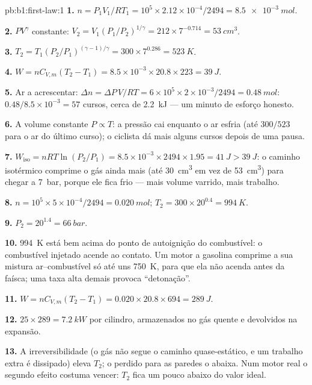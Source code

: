 \begin{solution}{pb:b1:first-law:1}
\textbf{1.} $n = P_1V_1/RT_1 = 10^5 \times 2.12\times10^{-4}/2494 = \qty{8.5e-3}{mol}$.

\textbf{2.} $PV^\gamma$ constante: $V_2 = V_1(P_1/P_2)^{1/\gamma} = 212 \times
7^{-0.714} = \qty{53}{cm^3}$.

\textbf{3.} $T_2 = T_1(P_2/P_1)^{(\gamma - 1)/\gamma} = 300 \times 7^{0.286} =
\qty{523}{K}$.

\textbf{4.} $W = nC_{V,m}(T_2 - T_1) = 8.5\times10^{-3} \times 20.8 \times 223 =
\qty{39}{J}$.

\textbf{5.} Ar a acrescentar: $\Delta n = \Delta P\,V/RT = 6\times10^5 \times 2\times10^{-3}/
2494 = \qty{0.48}{mol}$: $0.48/8.5\times10^{-3} = 57$ cursos, cerca de
\qty{2.2}{kJ} --- um minuto de esforço honesto.

\textbf{6.} A volume constante $P \propto T$: a pressão cai enquanto o ar
esfria (até $300/523$ para o ar do último curso); o ciclista dá mais alguns
cursos depois de uma pausa.

\textbf{7.} $W_{\text{iso}} = nRT\ln(P_2/P_1) = 8.5\times10^{-3} \times 2494 \times
1.95 = \qty{41}{J} > \qty{39}{J}$: o caminho isotérmico comprime o gás
ainda mais (até \qty{30}{cm^3} em vez de \qty{53}{cm^3}) para chegar a \qty{7}{bar},
porque ele fica frio --- mais volume varrido, mais trabalho.

\textbf{8.} $n = 10^5 \times 5\times10^{-4}/2494 = \qty{0.020}{mol}$; $T_2 =
300 \times 20^{0.4} = \qty{994}{K}$.

\textbf{9.} $P_2 = 20^{1.4} = \qty{66}{bar}$.

\textbf{10.} \qty{994}{K} está bem acima do ponto de autoignição do
combustível: o combustível injetado acende ao contato. Um motor a gasolina
comprime a sua mistura ar--combustível só até uns \qty{750}{K}, para que
ela não acenda antes da faísca; uma taxa alta demais provoca ``detonação''.

\textbf{11.} $W = nC_{V,m}(T_2 - T_1) = 0.020 \times 20.8 \times 694 = \qty{289}{J}$.

\textbf{12.} $25 \times 289 = \qty{7.2}{kW}$ por cilindro, armazenados no gás
quente e devolvidos na expansão.

\textbf{13.} A irreversibilidade (o gás não segue o caminho quase-estático,
e um trabalho extra é dissipado) eleva $T_2$; o  perdido para as
paredes o abaixa. Num motor real o segundo efeito costuma vencer: $T_2$
fica um pouco abaixo do valor ideal.


\end{solution}
